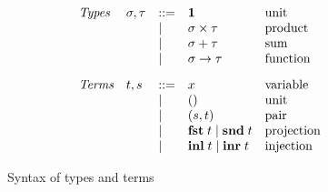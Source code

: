 \begin{figure}
  \small
  \[
  \begin{array}{lllll}
    \textit{Types} &
    \sigma, \tau
    & ::= &
    \mathbf{1}
    &
    \text{unit}
    \\
    && \mid &
    \sigma \times \tau
    &
    \text{product}
    \\
    && \mid &
    \sigma + \tau
    &
    \text{sum}
    \\
    && \mid &
    \sigma \to \tau
    &
    \text{function}
    \\[3mm]
    \textit{Terms} &
    t, s
    & ::= &
    x
    &
    \text{variable}
    \\
    && \mid &
    ()
    &
    \text{unit}
    \\
    && \mid &
    (s,t)
    &
    \text{pair}
    \\
    && \mid &
    \mathbf{fst}\;t \mid \mathbf{snd}\;t
    &
    \text{projection}
    \\
    && \mid &
    \mathbf{inl}\;t \mid \mathbf{inr}\;t
    &
    \text{injection}
    \\
  \end{array}
  \]
  \caption{Syntax of types and terms }
  \label{fig:syntax}
\end{figure}
